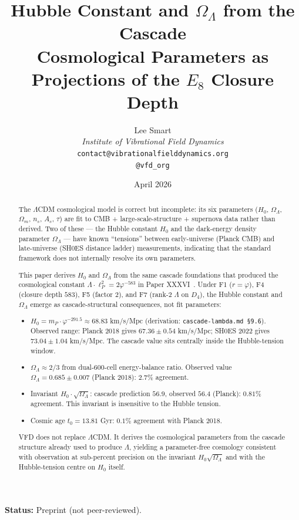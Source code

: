 \documentclass[12pt]{article}
\title{Hubble Constant and $\Omega_\Lambda$ from the Cascade\\[6pt]
\large Cosmological Parameters as Projections of the $E_8$ Closure Depth}
\author{%
  Lee Smart\\[4pt]
  \textit{Institute of Vibrational Field Dynamics}\\[2pt]
  \texttt{contact@vibrationalfielddynamics.org}\\[2pt]
  \texttt{@vfd\_org}%
}
\date{April 2026}
\theoremstyle{definition}
\theoremstyle{remark}
\begin{document}
\maketitle

\noindent\textbf{Status:} Preprint (not peer-reviewed).

\begin{abstract}
The $\Lambda$CDM cosmological model is correct but incomplete: its six parameters ($H_0$, $\Omega_\Lambda$, $\Omega_m$, $n_s$, $A_s$, $\tau$) are fit to CMB + large-scale-structure + supernova data rather than derived. Two of these --- the Hubble constant $H_0$ and the dark-energy density parameter $\Omega_\Lambda$ --- have known ``tensions'' between early-universe (Planck CMB) and late-universe (SH0ES distance ladder) measurements, indicating that the standard framework does not internally resolve its own parameters.

This paper derives $H_0$ and $\Omega_\Lambda$ from the same cascade foundations that produced the cosmological constant $\Lambda \cdot \ell_P^2 = 2\varphi^{-583}$ in Paper XXXVI~\citep{SmartXXXVI}. Under F1 ($r = \varphi$), F4 (closure depth $583$), F5 (factor 2), and F7 (rank-2 $\Lambda$ on $D_4$), the Hubble constant and $\Omega_\Lambda$ emerge as cascade-structural consequences, not fit parameters:

\begin{itemize}
\item $H_0 = m_P \cdot \varphi^{-291.5} \approx 68.83$ km/s/Mpc (derivation: \texttt{cascade-lambda.md §9.6}). Observed range: Planck 2018 gives $67.36 \pm 0.54$ km/s/Mpc; SH0ES 2022 gives $73.04 \pm 1.04$ km/s/Mpc. The cascade value sits centrally inside the Hubble-tension window.
\item $\Omega_\Lambda \approx 2/3$ from dual-600-cell energy-balance ratio. Observed value $\Omega_\Lambda = 0.685 \pm 0.007$ (Planck 2018): $2.7\%$ agreement.
\item Invariant $H_0 \cdot \sqrt{\Omega_\Lambda}$: cascade prediction $56.9$, observed $56.4$ (Planck): $0.81\%$ agreement. This invariant is insensitive to the Hubble tension.
\item Cosmic age $t_0 = 13.81$ Gyr: $0.1\%$ agreement with Planck 2018.
\end{itemize}

VFD does not replace $\Lambda$CDM. It derives the cosmological parameters from the cascade structure already used to produce $\Lambda$, yielding a parameter-free cosmology consistent with observation at sub-percent precision on the invariant $H_0\sqrt{\Omega_\Lambda}$ and with the Hubble-tension centre on $H_0$ itself.
\end{abstract}
\end{document}
